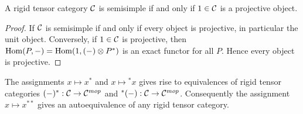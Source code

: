 \documentclass{amsart}
\begin{document}
\begin{corollary}
	A rigid tensor category $\mathcal C$ is semisimple if and only if $1 \in \mathcal C$ is a projective object. 
\end{corollary}

\begin{proof}
	If $\mathcal C$ is semisimple if and only if every object is projective, in particular the unit object. Conversely, if $1 \in \mathcal C$ is projective, then $\operatorname{Hom}(P, -) = \operatorname{Hom}( 1, (-) \otimes P^*)$ is an exact functor for all $P$. Hence every object is projective.  
\end{proof}

\begin{lemma}
	The assignments $x \mapsto x^*$ and $x \mapsto {}^*x$ gives rise to equivalences of rigid tensor categories $(-)^*: \mathcal C \to \mathcal C^{mop}$ and ${}^*(-): \mathcal C \to \mathcal C^{mop}$. Consequently the assignment $x \mapsto x^{**}$ gives an autoequivalence of any rigid tensor category. 
\end{lemma}

\end{document}

